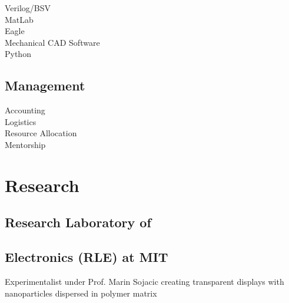 \documentclass[letterpaper, article]{deedy-resume-openfont}
\begin{document}
\begin{minipage}[t]{0.33\textwidth}
Verilog/BSV \hspace{2.625cm} \textbullet \textbullet  \textbullet \textbullet \textbullet \\
MatLab \hspace{3.28cm} \textbullet \textbullet \textbullet \textbullet  \textbullet\\
Eagle \hspace{3.63cm} \textbullet \textbullet \textbullet \textbullet \\
Mechanical CAD Software \hspace{.5cm} \textbullet \textbullet  \textbullet \\
Python \hspace{3.37cm}  \textbullet \textbullet  \textbullet \\






\sectionsep

\subsection{Management}
Accounting \hspace{2.75cm} \textbullet \textbullet \textbullet  \textbullet \textbullet\\
Logistics \hspace{3.15cm} \textbullet \textbullet  \textbullet \textbullet \\
Resource Allocation \hspace{1.47cm} \textbullet \textbullet \textbullet \textbullet \\
Mentorship \hspace{2.7cm} \textbullet \textbullet \textbullet  \\



\section{Research}

\subsection{Research Laboratory of \hfill}
\subsection{Electronics (RLE) at MIT \hfill}
Experimentalist under Prof. Marin Sojacic creating transparent displays with nanoparticles dispersed in polymer matrix
\sectionsep

\end{minipage}
\end{document}
